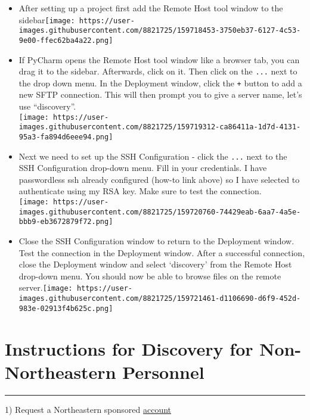 \documentclass[
  letterpaper,
  DIV=11,
  numbers=noendperiod]{scrreprt}
\begin{document}
\begin{itemize}
\item
  After setting up a project first add the Remote Host tool window to
  the
  sidebar\texttt{[image: https://user-images.githubusercontent.com/8821725/159718453-3750eb37-6127-4c53-9e00-ffec62ba4a22.png]}
\item
  If PyCharm opens the Remote Host tool window like a browser tab, you
  can drag it to the sidebar. Afterwards, click on it. Then click on the
  \texttt{...} next to the drop down menu. In the Deployment window,
  click the \texttt{+} button to add a new SFTP connection. This will
  then prompt you to give a server name, let's use ``discovery''.\\
  \texttt{[image: https://user-images.githubusercontent.com/8821725/159719312-ca86411a-1d7d-4131-95a3-fa894d6eee94.png]}
\item
  Next we need to set up the SSH Configuration - click the \texttt{...}
  next to the SSH Configuration drop-down menu. Fill in your
  credentials. I have passwordless ssh already configured (how-to link
  above) so I have selected to authenticate using my RSA key. Make sure
  to test the connection.\\
  \texttt{[image: https://user-images.githubusercontent.com/8821725/159720760-74429eab-6aa7-4a5e-bbb9-eb3672879f72.png]}
\item
  Close the SSH Configuration window to return to the Deployment window.
  Test the connection in the Deployment window. After a successful
  connection, close the Deployment window and select `discovery' from
  the Remote Host drop-down menu. You should now be able to browse files
  on the remote
  server.\texttt{[image: https://user-images.githubusercontent.com/8821725/159721461-d1106690-d6f9-452d-983e-02913f4b625c.png]}
\end{itemize}

\hfill\break

\hypertarget{instructions-for-discovery-for-non-northeastern-personnel}{%
\chapter{Instructions for Discovery for Non-Northeastern
Personnel}\label{instructions-for-discovery-for-non-northeastern-personnel}}

\begin{center}\rule{0.5\linewidth}{0.5pt}\end{center}

1) Request a Northeastern sponsored
\href{https://research.northeastern.edu/nu-res/request-nu-sponsored-account/}{account}
\end{document}
